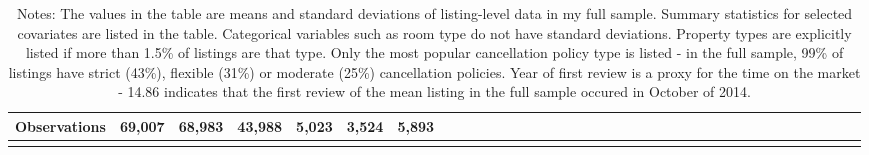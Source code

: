 {\begin{longtable}{l*{6}{c|c|cccc}}
\hline
Observations  & 69,007  & 68,983   &       43,988         &       5,023         &       3,524   & 5,893      \\
\hline\hline
\caption*{Notes: The values in the table are means and standard deviations of listing-level data in my full sample. Summary statistics for selected covariates are listed in the table. Categorical variables such as room type do not have standard deviations. Property types are explicitly listed if more than 1.5\% of listings are that type. Only the most popular cancellation policy type is listed - in the full sample, 99\% of listings have strict (43\%), flexible (31\%) or moderate (25\%) cancellation policies. Year of first review is a proxy for the time on the market - 14.86 indicates that the first review of the mean listing in the full sample occured in October of 2014.}

\end{longtable}
}
\normalsize



